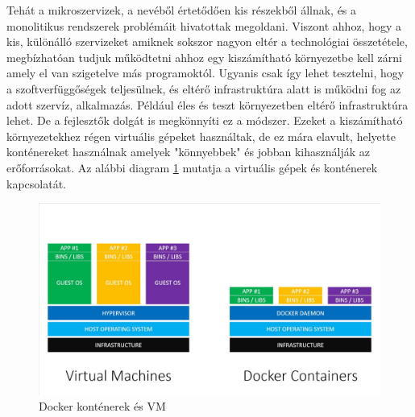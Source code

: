 Tehát a mikroszervizek, a nevéből értetődően kis részekből állnak, és a monolitikus rendszerek problémáit hivatottak megoldani.
Viszont ahhoz, hogy a kis, különálló szervizeket amiknek sokszor nagyon eltér a technológiai összetétele, megbízhatóan tudjuk működtetni ahhoz egy kiszámítható környezetbe kell zárni amely el van szigetelve más programoktól.
Ugyanis csak így lehet tesztelni, hogy a szoftverfüggőségek teljesülnek, és eltérő infrastruktúra alatt is működni fog az adott szervíz, alkalmazás.
Például éles és teszt környezetben eltérő infrastruktúra lehet.
De a fejlesztők dolgát is megkönnyíti ez a módszer.
Ezeket a kiszámítható környezetekhez régen virtuális gépeket használtak, de ez mára elavult, helyette konténereket használnak amelyek "könnyebbek" és jobban kihasználják az erőforrásokat.
Az alábbi diagram \ref{fig:docker-vm} mutatja a virtuális gépek és konténerek kapcsolatát.

\begin{figure}
    \centering
    \includegraphics[scale=0.3]{images/docker-vs-vms.jpg}
    \caption{Docker konténerek és VM}
    \label{fig:docker-vm}
\end{figure}
